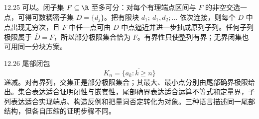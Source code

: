 \begin{solution}{12.25}
可以。闭子集 \(F\subseteq\R\) 至多可分：对每个有理端点区间与 \(F\) 的非空交选一点，可得可数稠密子集 \(D=\{d_j\}\)。把有限块
\(d_1;\ d_1,d_2;\ldots\) 依次连接，则每个 \(D\) 中点出现无穷次，且 \(F\) 中任一点可由 \(D\) 中点逼近并进一步抽成原列子列。任何子列极限属于 \(\overline D=F\)，所以部分极限集合恰为 \(F\)。有界性只使整列有界；无界闭集也可用同一分块方案。
\end{solution}

\begin{solution}{12.26}
尾部闭包
\[
 K_n=\overline{\{a_k:k\ge n\}}
\]
递减。对有界列，交集正是部分极限集合；其最大、最小点分别由尾部确界极限给出。集合表达适合证明闭性与嵌套性，尾部确界表达适合运算不等式和定量界，子列表达适合实现端点、构造反例和把量词否定转化为对象。三种语言描述同一尾部结构，但各自压缩的证明步骤不同。
\end{solution}
